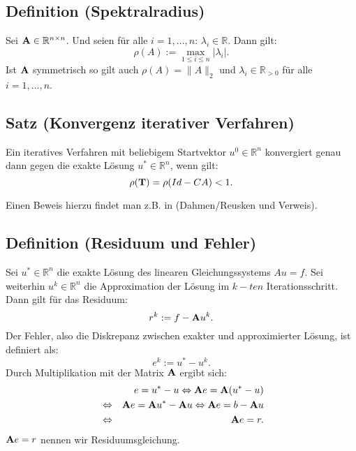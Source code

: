 \subsection{Definition (Spektralradius)}\label{s.Spektralradius}

Sei ${\textbf{A}} \in \mathbb{R}^{n \times n}$. Und seien für alle $i=1,...,n$: $\lambda_{i} \in \mathbb{R}$. Dann gilt:
\begin{equation}
\rho(A) := \max_{1 \le i \le n} | \lambda_{i} |.
\end{equation}
Ist ${\textbf{A}}$ symmetrisch so gilt auch $\rho(A) = \| A \|_{2}$ und $\lambda_{i} \in \mathbb{R}_{>0}$ für alle $i=1,...,n$.

\subsection{Satz (Konvergenz iterativer Verfahren)}\label{ss.Konvergenz iterativer Verfahren}

Ein iteratives Verfahren mit beliebigem Startvektor $u^{0} \in \mathbb{R}^{n}$ konvergiert genau dann gegen die exakte Lösung $u^{*} \in \mathbb{R}^{n}$, wenn gilt:
\begin{equation}
\rho({\textbf{T}}) = \rho(Id - CA) < 1.
\end{equation}

Einen Beweis hierzu findet man z.B. in (Dahmen/Reusken und Verweis).

\subsection{Definition (Residuum und Fehler)}\label{ss.Residuum und Fehler}

Sei $u^{*} \in \mathbb{R}^{n}$ die exakte Lösung des linearen Gleichungssystems $Au = f$. Sei weiterhin $u^{k} \in \mathbb{R}^{n}$ die Approximation der Lösung im $k-ten$ Iterationsschritt. Dann gilt für das Residuum:
\begin{equation}
r^{k} := f - {\textbf{A}} u^{k}.\label{eq.Residuum}
\end{equation}
Der Fehler, also die Diskrepanz zwischen exakter und approximierter Lösung, ist definiert als:
\begin{equation}
e^{k} := u^{*} - u^{k}.\label{eq.Fehler}
\end{equation}
Durch Multiplikation mit der Matrix ${\textbf{A}}$ ergibt sich:
\begin{eqnarray}
&&e = u^{*} - u \Leftrightarrow {\textbf{A}}e = {\textbf{A}}(u^{*} - u) \notag \\
&\Leftrightarrow& {\textbf{A}}e = {\textbf{A}} u^{*} - {\textbf{A}} u \Leftrightarrow {\textbf{A}}e = b - {\textbf{A}} u \notag \\
&\Leftrightarrow& {\textbf{A}}e = r.\label{eq.Residuumsgleichung}
\end{eqnarray}
${\textbf{A}}e = r$ nennen wir Residuumsgleichung.

